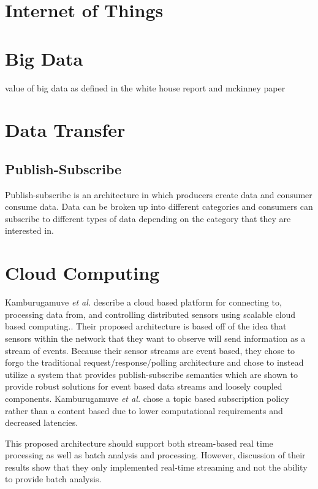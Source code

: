 \section{Internet of Things}

\section{Big Data}

value of big data as defined in the white house report and mckinney paper

\section{Data Transfer}
\subsection{Publish-Subscribe}
Publish-subscribe is an architecture in which producers create data and consumer consume data. Data can be broken up into different categories and consumers can subscribe to different types of data depending on the category that they are interested in.

\section{Cloud Computing}
Kamburugamuve \emph{et al.} describe a cloud based platform for connecting to, processing data from, and controlling distributed sensors using scalable cloud based computing.\cite{kamburugamuve_framework_2015}.  Their proposed architecture is based off of the idea that sensors within the network that they want to observe will send information as a stream of events. Because their sensor streams are event based, they chose to forgo the traditional request/response/polling architecture and chose to instead utilize a system that provides publish-subscribe semantics which are shown to provide robust solutions for event based data streams and loosely coupled components\cite{eugster_many_2003}. Kamburugamuve \emph{et al.} chose a topic based subscription policy rather than a content based due to lower computational requirements and decreased latencies.

This proposed architecture should support both stream-based real time processing as well as batch analysis and processing. However, discussion of their results show that they only implemented real-time streaming and not the ability to provide batch analysis. 

